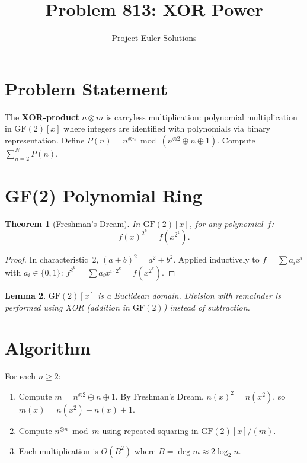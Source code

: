 \documentclass[11pt]{article}
\title{Problem 813: XOR Power}
\author{Project Euler Solutions}
\date{}
\newtheorem{theorem}{Theorem}
\newtheorem{lemma}[theorem]{Lemma}
\begin{document}
\maketitle

\section{Problem Statement}

The \textbf{XOR-product} $n \otimes m$ is carryless multiplication: polynomial multiplication in $\mathrm{GF}(2)[x]$ where integers are identified with polynomials via binary representation. Define $P(n) = n^{\otimes n} \bmod (n^{\otimes 2} \oplus n \oplus 1)$. Compute $\sum_{n=2}^{N} P(n)$.

\section{GF(2) Polynomial Ring}

\begin{theorem}[Freshman's Dream]
In $\mathrm{GF}(2)[x]$, for any polynomial~$f$:
\[
f(x)^{2^k} = f(x^{2^k}).
\]
\end{theorem}

\begin{proof}
In characteristic~2, $(a+b)^2 = a^2 + b^2$. Applied inductively to $f = \sum a_i x^i$ with $a_i \in \{0,1\}$: $f^{2^k} = \sum a_i x^{i \cdot 2^k} = f(x^{2^k})$.
\end{proof}

\begin{lemma}
$\mathrm{GF}(2)[x]$ is a Euclidean domain. Division with remainder is performed using XOR (addition in $\mathrm{GF}(2)$) instead of subtraction.
\end{lemma}

\section{Algorithm}

For each $n \ge 2$:
\begin{enumerate}
\item Compute $m = n^{\otimes 2} \oplus n \oplus 1$. By Freshman's Dream, $n(x)^2 = n(x^2)$, so $m(x) = n(x^2) + n(x) + 1$.
\item Compute $n^{\otimes n} \bmod m$ using repeated squaring in $\mathrm{GF}(2)[x]/(m)$.
\item Each multiplication is $O(B^2)$ where $B = \deg m \approx 2\log_2 n$.
\end{enumerate}
\end{document}
